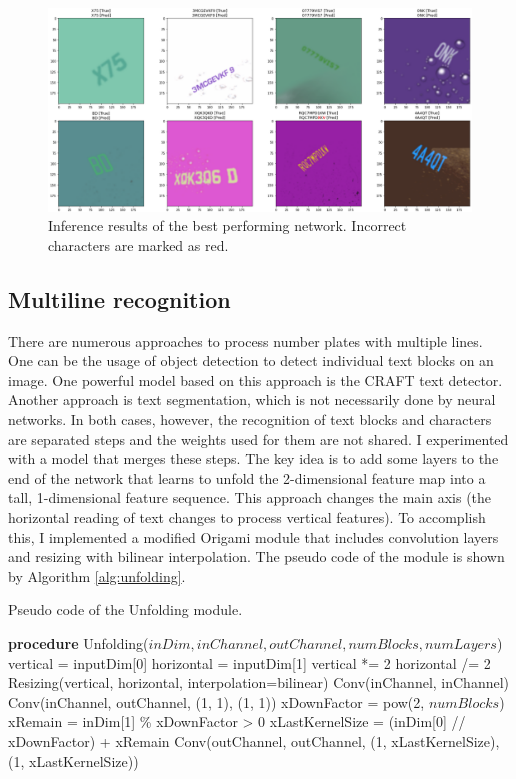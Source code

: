 \begin{figure}[htb]
 \centerline{\includegraphics[width=1.0\columnwidth]{.//Figure/OCR/inference_sequential.png}}
 \caption{Inference results of the best performing network. Incorrect characters are marked as red.}
 \label{fig:inference_sequential}
\end{figure}

\subsection{Multiline recognition}

There are numerous approaches to process number plates with multiple lines. One can be the usage of object detection to detect individual text blocks on an image. One powerful model based on this approach is the CRAFT\cite{CRAFT} text detector. Another approach is text segmentation, which is not necessarily done by neural networks. In both cases, however, the recognition of text blocks and characters are separated steps and the weights used for them are not shared. I experimented with a model that merges these steps. The key idea is to add some layers to the end of the network that learns to unfold the 2-dimensional feature map into a tall, 1-dimensional feature sequence. This approach changes the main axis (the horizontal reading of text changes to process vertical features). To accomplish this, I implemented a modified Origami\cite{OrigamiNet} module that includes convolution layers and resizing with bilinear interpolation. The pseudo code of the module is shown by Algorithm \ref{alg:unfolding}.

 \begin{algorithm}
 \caption{Pseudo code of the Unfolding module.}
 \label{alg:unfolding}
 \begin{algorithmic}[1]
    \STATE \textbf{procedure} Unfolding($inDim, inChannel, outChannel, numBlocks, numLayers$)
    \STATE vertical = inputDim[0]
    \STATE horizontal = inputDim[1]
    \STATE vertical *= 2
    \STATE horizontal /= 2
    \STATE Resizing(vertical, horizontal, interpolation=bilinear)
    \STATE Conv(inChannel, inChannel)
    \ENDFOR
    \ENDFOR
    \STATE Conv(inChannel, outChannel, (1, 1), (1, 1))
    \STATE xDownFactor = pow(2, $numBlocks$)
    \STATE xRemain = inDim[1] \% xDownFactor > 0
    \STATE xLastKernelSize = (inDim[0] // xDownFactor) + xRemain
    \STATE Conv(outChannel, outChannel, (1, xLastKernelSize), (1, xLastKernelSize))
\end{algorithmic}
\end{algorithm}

